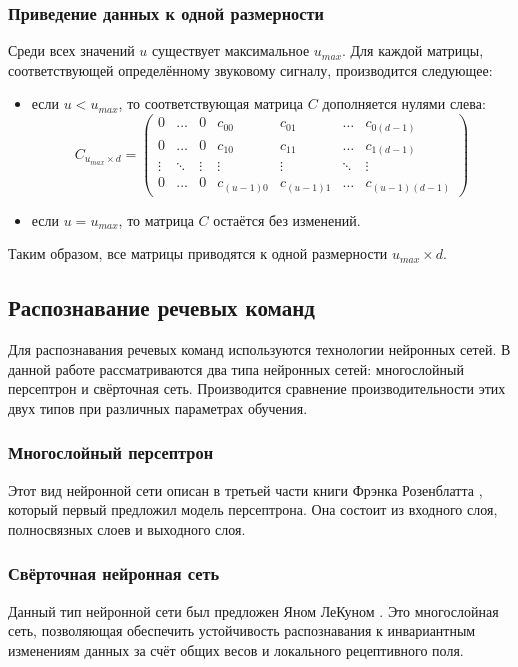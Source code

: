 \subsubsection{Приведение данных к одной размерности}
Среди всех значений $u$ существует максимальное $u_{max}$. Для каждой матрицы, соответствующей определённому звуковому сигналу, производится следующее:
\begin{itemize}[leftmargin=2cm]
	\item если $u < u_{max}$, то соответствующая матрица $C$ дополняется нулями слева:
	\begin{equation*}
		C_{u_{max} \times d} = \left(
		\begin{array}{ccccccc}
			0 & \ldots & 0 & c_{00} & c_{01} & \ldots & c_{0(d-1)}\\
			0 & \ldots & 0 & c_{10} &  c_{11} & \ldots & c_{1(d-1)}\\
			\vdots & \ddots & \vdots & \vdots & \vdots & \ddots & \vdots\\
			0 & \ldots & 0 & c_{(u-1)0} & c_{(u-1)1} & \ldots & c_{(u-1)(d-1)}
		\end{array}
		\right)
	\end{equation*}
	\item если $u = u_{max}$, то матрица $C$ остаётся без изменений.
\end{itemize}

Таким образом, все матрицы приводятся к одной размерности $u_{max} \times d$.

\subsection{Распознавание речевых команд}
Для распознавания речевых команд используются технологии нейронных сетей. В данной работе рассматриваются два типа нейронных сетей: многослойный персептрон и свёрточная сеть. Производится сравнение производительности этих двух типов при различных параметрах обучения.
\subsubsection{Многослойный персептрон}
Этот вид нейронной сети описан в третьей части книги Фрэнка Розенблатта \cite{PerceptronBook}, который первый предложил модель персептрона. Она состоит из входного слоя, полносвязных слоев и выходного слоя.
\subsubsection{Свёрточная нейронная сеть}
Данный тип нейронной сети был предложен Яном ЛеКуном \cite{CNN}. Это многослойная сеть, позволяющая обеспечить устойчивость распознавания к инвариантным изменениям данных за счёт общих весов и локального рецептивного поля.

